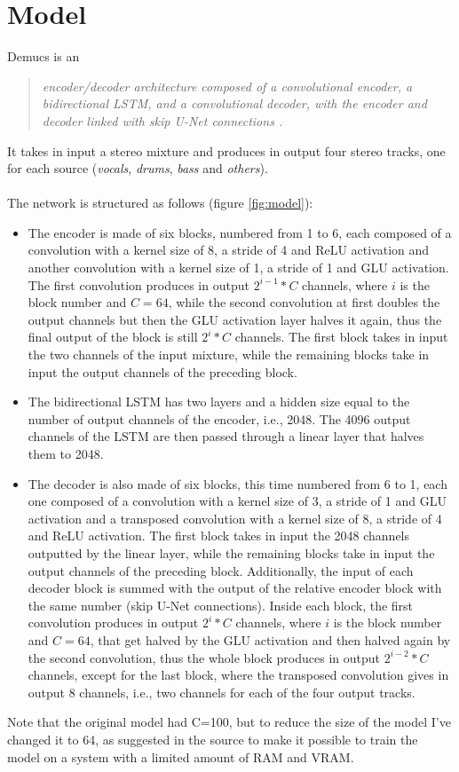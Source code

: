 \documentclass[12pt]{article}
\begin{document}
\section{Model}\label{sec:model}
Demucs is an 
\begin{quote}
\textit{encoder/decoder architecture composed of a convolutional encoder, a bidirectional LSTM, and a convolutional decoder, with the encoder and decoder linked with skip U-Net connections \cite{Defossez_2019}.}
\end{quote}
It takes in input a stereo mixture and produces in output four stereo tracks, one for each source (\textit{vocals}, \textit{drums}, \textit{bass} and \textit{others}).\\\\
The network is structured as follows (figure \ref{fig:model}):
\begin{itemize}
\item The encoder is made of six blocks, numbered from 1 to 6, each composed of a convolution with a kernel size of 8, a stride of 4 and ReLU activation and another convolution with a kernel size of 1, a stride of 1 and GLU activation. The first convolution produces in output \(2^{i-1}*C\) channels, where \(i\) is the block number and \(C=64\), while the second convolution at first doubles the output channels but then the GLU activation layer halves it again, thus the final output of the block is still \(2^i*C\) channels. The first block takes in input the two channels of the input mixture, while the remaining blocks take in input the output channels of the preceding block.
\item The bidirectional LSTM has two layers and a hidden size equal to the number of output channels of the encoder, i.e., 2048. The 4096 output channels of the LSTM are then passed through a linear layer that halves them to 2048.
\item The decoder is also made of six blocks, this time numbered from 6 to 1, each one composed of a convolution with a kernel size of 3, a stride of 1 and GLU activation and a transposed convolution with a kernel size of 8, a stride of 4 and ReLU activation. The first block takes in input the 2048 channels outputted by the linear layer, while the remaining blocks take in input the output channels of the preceding block. Additionally, the input of each decoder block is summed with the output of the relative encoder block with the same number (skip U-Net connections). Inside each block, the first convolution produces in output \(2^{i}*C\) channels, where \(i\) is the block number and \(C=64\), that get halved by the GLU activation and then halved again by the second convolution, thus the whole block produces in output \(2^{i-2}*C\) channels, except for the last block, where the transposed convolution gives in output 8 channels, i.e., two channels for each of the four output tracks.
\end{itemize}
Note that the original model had C=100, but to reduce the size of the model I've changed it to 64, as suggested in the source to make it possible to train the model on a system with a limited amount of RAM and VRAM.
\end{document}
